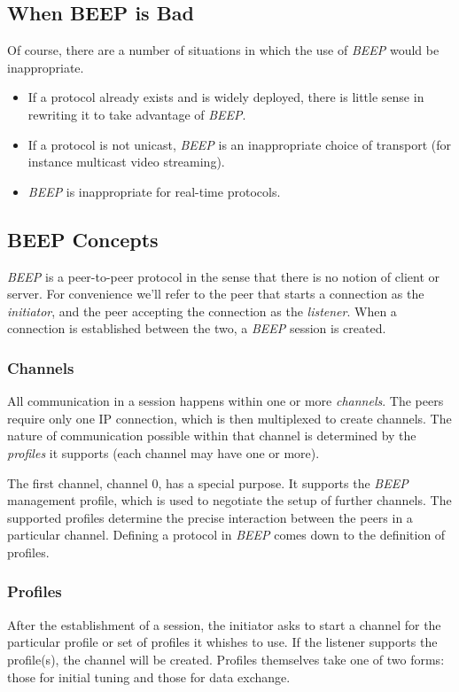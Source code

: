 \subsection{When BEEP is Bad}
Of course, there are a number of situations in which the use of \emph{BEEP} would be inappropriate. 
\begin{itemize}
 \item If a protocol already exists and is widely deployed, there is little sense in rewriting it to take advantage of \emph{BEEP}.
 \item If a protocol is not unicast, \emph{BEEP} is an inappropriate choice of transport (for instance multicast video streaming).
 \item \emph{BEEP} is inappropriate for real-time protocols.
\end{itemize}

\subsection{BEEP Concepts}
\emph{BEEP} is a peer-to-peer protocol in the sense that there is no notion of client or server. For convenience we'll refer to the peer that starts a connection as the \emph{initiator}, and the peer accepting the connection as the \emph{listener}. When a connection is established between the two, a \emph{BEEP} session is created.

\subsubsection{Channels}
All communication in a session happens within one or more \emph{channels}. The peers require only one IP connection, which is then multiplexed to create channels. The nature of communication possible within that channel is determined by the \emph{profiles} it supports (each channel may have one or more).

The first channel, channel 0, has a special purpose. It supports the \emph{BEEP} management profile, which is used to negotiate the setup of further channels. The supported profiles determine the precise interaction between the peers in a particular channel. Defining a protocol in \emph{BEEP} comes down to the definition of profiles.

\subsubsection{Profiles}
After the establishment of a session, the initiator asks to start a channel for the particular profile or set of profiles it whishes to use. If the listener supports the profile(s), the channel will be created. Profiles themselves take one of two forms: those for initial tuning and those for data exchange.

